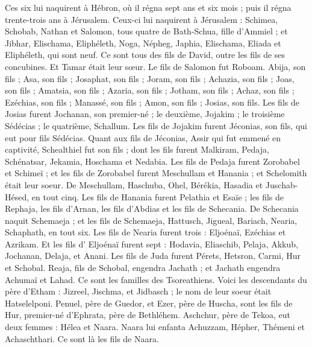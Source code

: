 \begin{multicols}{2}
Ces six lui naquirent à Hébron, où il régna sept ans et six mois ; puis il régna trente-trois ans à Jérusalem.
Ceux-ci lui naquirent à Jérusalem : Schimea, Schobab, Nathan et Salomon, tous quatre de Bath-Schua, fille d'Ammiel ;
et Jibhar, Elischama, Eliphéleth,
Noga, Népheg, Japhia,
Elischama, Eliada et Eliphéleth, qui sont neuf.
Ce sont tous des fils de David, outre les fils de ses concubines. Et Tamar était leur sœur.
Le fils de Salomon fut  Roboam. Abija, son fils ; Asa, son fils ; Josaphat, son fils ;
Joram, son fils ; Achazia, son fils ; Joas, son fils ;
Amatsia, son fils ; Azaria, son fils ; Jotham, son fils ;
Achaz, son fils ; Ezéchias, son fils ; Manassé, son fils ;
Amon, son fils ; Josias, son fils.
Les fils de Josias furent Jochanan, son premier-né ; le deuxième, Jojakim ; le troisième Sédécias ; le quatrième, Schallum.
Les fils de Jojakim furent  Jéconias, son fils, qui eut pour fils Sédécias.
Quant aux fils de Jéconias, Assir qui fut emmené en captivité, Schealthiel fut son fils ;
dont les fils furent Malkiram, Pedaja, Schénatsar, Jekamia, Hoschama et Nedabia.
Les fils de Pedaja furent Zorobabel et Schimeï ; et les fils de Zorobabel furent Meschullam et Hanania ; et Schelomith était leur soeur.
De Meschullam, Haschuba, Ohel, Bérékia, Hasadia et Juschab-Hésed, en tout cinq.
Les fils de Hanania furent  Pelathia et Esaïe ; les fils de Rephaja, les fils d'Arnan, les fils d’Abdias et les fils de Schecania.
De Schecania naquit Schemaeja ; et les fils de Schemaeja, Hattusch, Jigueal, Bariach, Nearia, Schaphath, en tout six.
Les fils de Nearia furent trois : Eljoénaï, Ezéchias et Azrikam.
Et les fils d' Eljoénaï furent  sept : Hodavia, Eliaschib, Pelaja, Akkub, Jochanan, Delaja, et Anani.
\VerseOne{}Les fils de Juda furent Pérets, Hetsron, Carmi, Hur et Schobal.
Reaja, fils de Schobal, engendra Jachath ; et Jachath engendra Achumaï et Lahad. Ce sont les familles des Tsoreathiens.
Voici les descendants du père d’Etham : Jizreel, Jischma, et Jidbasch ; le nom de leur soeur était Hatselelponi.
Penuel, père de Guedor, et Ezer, père de Huscha, sont les fils de Hur, premier-né d'Ephrata, père de Bethléhem.
Aschchur, père de Tekoa, eut deux femmes : Hélea et Naara.
Naara lui enfanta Achuzzam, Hépher, Thémeni et Achaschthari. Ce sont là les fils de Naara.

\end{multicols}
